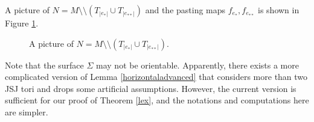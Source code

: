 \documentclass{amsart}
\numberwithin{equation}{section}
\theoremstyle{definition}
\begin{document}
A picture of $N=M\setminus\setminus (T_{|e_*|}\cup T_{|e_{**}|})$ and the pasting maps $f_{e_*},f_{e_{**}}$ is shown in Figure \ref{Figure1}.

\begin{figure}[htbp]
    \centering
    \def\svgwidth{4in} %
   
    \caption{A picture of $N=M\setminus\setminus (T_{|e_*|}\cup T_{|e_{**}|})$.}
     \label{Figure1}
\end{figure}

Note that the surface $\Sigma$ may not be orientable.
Apparently, there exists a more complicated version of Lemma \ref{horizontaladvanced} that considers more than two JSJ tori and drops some artificial assumptions. However, the current version is sufficient for our proof of Theorem \ref{lex}, and the notations and computations here are simpler.
\end{document}
